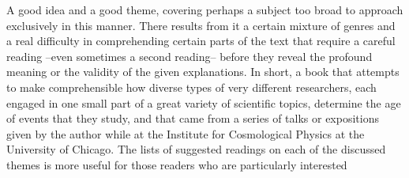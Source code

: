 A good idea and a good theme, covering perhaps a subject too broad to approach exclusively in this manner. There results from it a certain mixture of genres and a real difficulty in comprehending certain parts of the text that require a careful reading --even sometimes a second reading-- before they reveal  the profound meaning or the validity of the given explanations. In short, a book that attempts to make comprehensible how diverse types of very different researchers, each engaged in one small part of a great variety of scientific topics, determine the age of events that they study, and that came from a series of talks or expositions given by the author while at the Institute for Cosmological Physics at the University of Chicago. The lists of suggested readings on each of the discussed themes is more useful for those readers who are particularly interested

